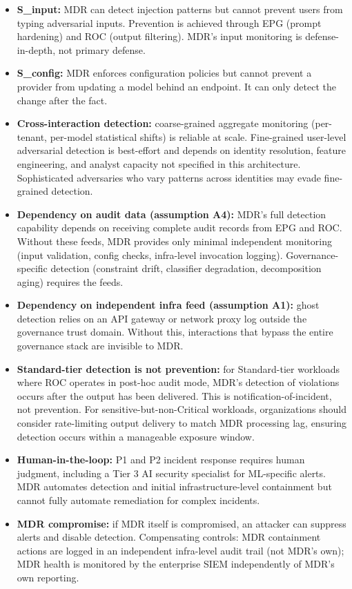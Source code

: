 \begin{itemize}
  \item \textbf{S\_\allowbreak{}input:} MDR can detect injection patterns but cannot prevent users from typing adversarial inputs. Prevention is achieved through EPG (prompt hardening) and ROC (output filtering). MDR's input monitoring is defense-in-depth, not primary defense.
  \item \textbf{S\_\allowbreak{}config:} MDR enforces configuration policies but cannot prevent a provider from updating a model behind an endpoint. It can only detect the change after the fact.
  \item \textbf{Cross-interaction detection:} coarse-grained aggregate monitoring (per-tenant, per-model statistical shifts) is reliable at scale. Fine-grained user-level adversarial detection is best-effort and depends on identity resolution, feature engineering, and analyst capacity not specified in this architecture. Sophisticated adversaries who vary patterns across identities may evade fine-grained detection.
  \item \textbf{Dependency on audit data (assumption A4):} MDR's full detection capability depends on receiving complete audit records from EPG and ROC. Without these feeds, MDR provides only minimal independent monitoring (input validation, config checks, infra-level invocation logging). Governance-specific detection (constraint drift, classifier degradation, decomposition aging) requires the feeds.
  \item \textbf{Dependency on independent infra feed (assumption A1):} ghost detection relies on an API gateway or network proxy log outside the governance trust domain. Without this, interactions that bypass the entire governance stack are invisible to MDR.
  \item \textbf{Standard-tier detection is not prevention:} for Standard-tier workloads where ROC operates in post-hoc audit mode, MDR's detection of violations occurs after the output has been delivered. This is notification-of-incident, not prevention. For sensitive-but-non-Critical workloads, organizations should consider rate-limiting output delivery to match MDR processing lag, ensuring detection occurs within a manageable exposure window.
  \item \textbf{Human-in-the-loop:} P1 and P2 incident response requires human judgment, including a Tier 3 AI security specialist for ML-specific alerts. MDR automates detection and initial infrastructure-level containment but cannot fully automate remediation for complex incidents.
  \item \textbf{MDR compromise:} if MDR itself is compromised, an attacker can suppress alerts and disable detection. Compensating controls: MDR containment actions are logged in an independent infra-level audit trail (not MDR's own); MDR health is monitored by the enterprise SIEM independently of MDR's own reporting.
\end{itemize}


